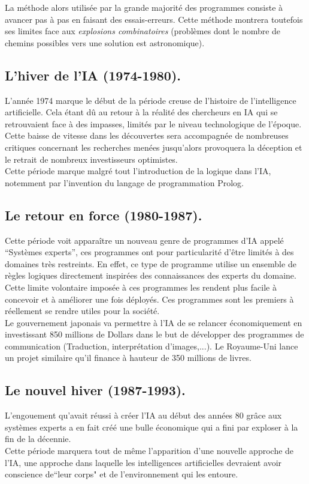 \documentclass[a4paper, 12pt]{article}
\numberwithin{equation}{subsection}
\begin{document}
La méthode alors utilisée par la grande majorité des programmes consiste à avancer pas à pas en faisant des essais-erreurs. Cette méthode montrera toutefois ses limites face aux \textit{explosions combinatoires} (problèmes dont le nombre de chemins possibles vers une solution est astronomique).
\subsection{L'hiver de l'IA (1974-1980).}
L'année 1974 marque le début de la période creuse de l'histoire de l'intelligence artificielle. Cela étant dû au retour à la réalité des chercheurs en IA qui se retrouvaient face à des impasses, limités par le niveau technologique de l'époque. Cette baisse de vitesse dans les découvertes sera accompagnée de nombreuses critiques concernant les recherches menées jusqu'alors provoquera la déception et le retrait de nombreux investisseurs optimistes.\\

Cette période marque malgré tout l'introduction de la logique dans l'IA, notemment par l'invention du langage de programmation Prolog.
\subsection{Le retour en force (1980-1987).}
Cette période voit apparaître un nouveau genre de programmes d'IA appelé ``Systèmes experts'', ces programmes ont pour particularité d'être limités à des domaines très restreints. En effet, ce type de programme utilise un ensemble de règles logiques directement inspirées des connaissances des experts du domaine. Cette limite volontaire imposée à ces programmes les rendent plus facile à concevoir et à améliorer une fois déployés. Ces programmes sont les premiers à réellement se rendre utiles pour la société.\\

Le gouvernement japonais va permettre à l'IA de se relancer économiquement en investissant 850 millions de Dollars dans le but de développer des programmes de communication (Traduction, interprétation d'images,...). Le Royaume-Uni lance un projet similaire qu'il finance à hauteur de 350 millions de livres.
\subsection{Le nouvel hiver (1987-1993).}
L'engouement qu'avait réussi à créer l'IA au début des années 80 grâce aux systèmes experts a en fait créé une bulle économique qui a fini par exploser à la fin de la décennie.\\
Cette période marquera tout de même l'apparition d'une nouvelle approche de l'IA, une approche dans laquelle les intelligences artificielles devraient avoir conscience de``leur corps" et de l'environnement qui les entoure.
\end{document}
